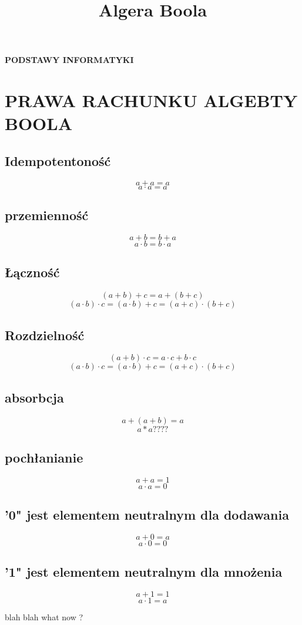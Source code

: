 \documentclass{article}
\title{Algera Boola}
\begin{document}
\begin{titlepage}
    \begin{center}
        \vspace*{1cm}
        
        \Huge
        \textbf{PODSTAWY INFORMATYKI}
        
        \vspace{1.5cm}
    \end{center}
\end{titlepage}
\newpage
\section{PRAWA RACHUNKU ALGEBTY BOOLA}
\subsection{Idempotentoność}
\[a + a = a\]
\[a \cdot a = a\]
\subsection{przemienność}
\[a + b = b + a\]
\[a \cdot b = b \cdot a\]
\subsection{Łączność}
\[(a + b) + c = a + (b + c)\]
\[(a \cdot b) \cdot c = (a \cdot b) + c = (a + c) \cdot (b + c)\]
\subsection{Rozdzielność}
\[(a + b) \cdot c = a \cdot c + b \cdot c\]
\[(a \cdot b) \cdot c = (a \cdot b) + c = (a + c) \cdot (b + c)\]
\subsection{absorbcja}
\[a + (a + b) = a\]
\[a * a ????\]
\subsection{pochłanianie}
\[a + a = 1\]
\[a \cdot a = 0\]
\subsection{'0" jest elementem neutralnym dla dodawania}
\[a + 0 = a\]
\[a \cdot 0 = 0\]
\subsection{'1" jest elementem neutralnym dla mnożenia}
\[a + 1 = 1\]
\[a \cdot 1 = a\]




blah blah what now ?
\end{document}
